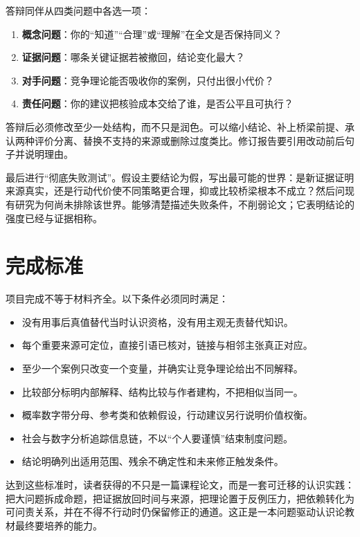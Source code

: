 答辩同伴从四类问题中各选一项：

\begin{enumerate}
\item \textbf{概念问题}：你的“知道”“合理”或“理解”在全文是否保持同义？
\item \textbf{证据问题}：哪条关键证据若被撤回，结论变化最大？
\item \textbf{对手问题}：竞争理论能否吸收你的案例，只付出很小代价？
\item \textbf{责任问题}：你的建议把核验成本交给了谁，是否公平且可执行？
\end{enumerate}

答辩后必须修改至少一处结构，而不只是润色。可以缩小结论、补上桥梁前提、承认两种评价分离、替换不支持的来源或删除过度类比。修订报告要引用改动前后句子并说明理由。

最后进行“彻底失败测试”。假设主要结论为假，写出最可能的世界：是新证据证明来源真实，还是行动代价使不同策略更合理，抑或比较桥梁根本不成立？然后问现有研究为何尚未排除该世界。能够清楚描述失败条件，不削弱论文；它表明结论的强度已经与证据相称。

\section{完成标准}

项目完成不等于材料齐全。以下条件必须同时满足：

\begin{itemize}
\item 没有用事后真值替代当时认识资格，没有用主观无责替代知识。
\item 每个重要来源可定位，直接引语已核对，链接与相邻主张真正对应。
\item 至少一个案例只改变一个变量，并确实让竞争理论给出不同解释。
\item 比较部分标明内部解释、结构比较与作者建构，不把相似当同一。
\item 概率数字带分母、参考类和依赖假设，行动建议另行说明价值权衡。
\item 社会与数字分析追踪信息链，不以“个人要谨慎”结束制度问题。
\item 结论明确列出适用范围、残余不确定性和未来修正触发条件。
\end{itemize}

达到这些标准时，读者获得的不只是一篇课程论文，而是一套可迁移的认识实践：把大问题拆成命题，把证据放回时间与来源，把理论置于反例压力，把依赖转化为可问责关系，并在不得不行动时仍保留修正的通道。这正是一本问题驱动认识论教材最终要培养的能力。

